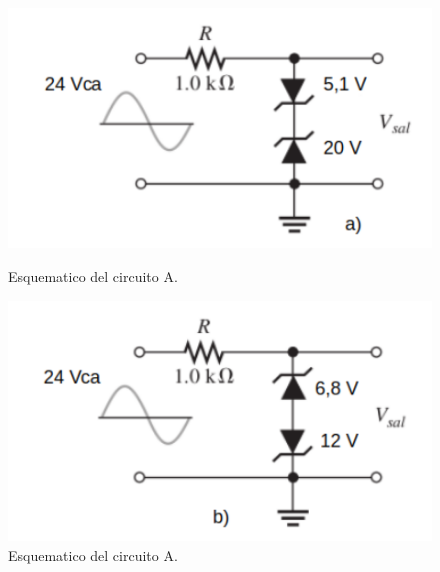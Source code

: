 \documentclass[chaptersright]{informeutn}
\begin{document}
 
    \begin{figure}[H]
        \centering
 \begin{minipage}{0.46\textwidth}
    \centering
        \includegraphics[width=\textwidth]{pictures/Esquematico_circuito_a.png}
        \caption{Esquematico del circuito A.}
    \end{minipage}
\hspace{0.05\textwidth}
\begin{minipage}{0.46\textwidth}
    \centering
        \includegraphics[width=\textwidth]{pictures/Esquematico_circuito_B.png}
        \caption{Esquematico del circuito A.}
    \end{minipage}
    \end{figure}
\end{document}

